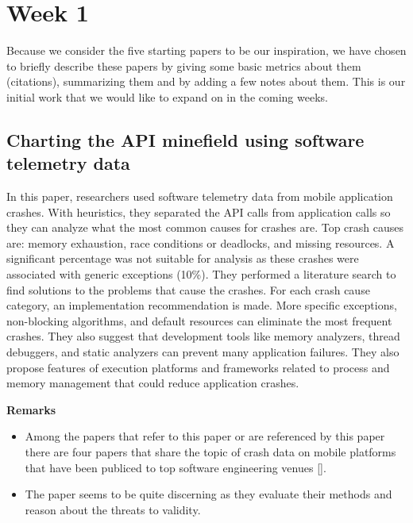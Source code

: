 \documentclass[]{book}
\providecommand{\tightlist}{%
  \setlength{\itemsep}{0pt}\setlength{\parskip}{0pt}}
\begin{document}
\section{Week 1}\label{week-1}

Because we consider the five starting papers to be our inspiration, we
have chosen to briefly describe these papers by giving some basic
metrics about them (citations), summarizing them and by adding a few
notes about them. This is our initial work that we would like to expand
on in the coming weeks.

\subsection{Charting the API minefield using software telemetry
data}\label{charting-the-api-minefield-using-software-telemetry-data}

In this paper, researchers used software telemetry data from mobile
application crashes. With heuristics, they separated the API calls from
application calls so they can analyze what the most common causes for
crashes are. Top crash causes are: memory exhaustion, race conditions or
deadlocks, and missing resources. A significant percentage was not
suitable for analysis as these crashes were associated with generic
exceptions (10\%). They performed a literature search to find solutions
to the problems that cause the crashes. For each crash cause category,
an implementation recommendation is made. More specific exceptions,
non-blocking algorithms, and default resources can eliminate the most
frequent crashes. They also suggest that development tools like memory
analyzers, thread debuggers, and static analyzers can prevent many
application failures. They also propose features of execution platforms
and frameworks related to process and memory management that could
reduce application crashes.

\textbf{Remarks}

\begin{itemize}
\tightlist
\item
  Among the papers that refer to this paper or are referenced by this
  paper there are four papers that share the topic of crash data on
  mobile platforms that have been publiced to top software engineering
  venues {[}{]}.
\item
  The paper seems to be quite discerning as they evaluate their methods
  and reason about the threats to validity.
\end{itemize}
\end{document}
